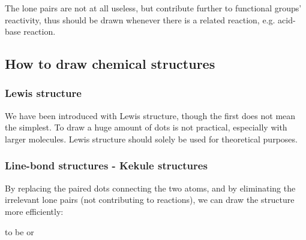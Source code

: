 \documentclass{report}
\begin{document}
		The lone pairs are not at all useless, but contribute further to functional groups' reactivity, thus should be drawn whenever there is a related reaction, e.g. acid-base reaction.
		
		\subsection{How to draw chemical structures}
			\subsubsection{Lewis structure}
				We have been introduced with Lewis structure, though the first does not mean the simplest. To draw a huge amount of dots is not practical, especially with larger molecules. Lewis structure should solely be used for theoretical purposes.
			\subsubsection{Line-bond structures - Kekule structures}
				By replacing the paired dots connecting the two atoms, and by eliminating the irrelevant lone pairs (not contributing to reactions), we can draw the structure more efficiently:
				\begin{center}
					 \hfill
					to be \hfill
					 \hfill
					or \hfill
				\end{center}
			
\end{document}
